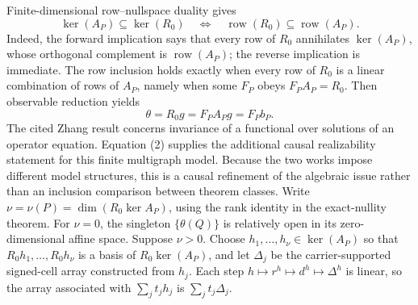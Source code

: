 Finite-dimensional row--nullspace duality gives
\[
\ker(A_P)\subseteq\ker(R_0)
\quad\Longleftrightarrow\quad
\operatorname{row}(R_0)\subseteq\operatorname{row}(A_P).
\tag{3}
\]
Indeed, the forward implication says that every row of \(R_0\) annihilates \(\ker(A_P)\), whose orthogonal complement is \(\operatorname{row}(A_P)\); the reverse implication is immediate.  The row inclusion holds exactly when every row of \(R_0\) is a linear combination of rows of \(A_P\), namely when some \(F_P\) obeys \(F_PA_P=R_0\).  Then observable reduction yields
\[
\theta=R_0g=F_PA_Pg=F_Pb_P.
\tag{4}
\]
The cited Zhang result concerns invariance of a functional over solutions of an operator equation.  Equation (2) supplies the additional causal realizability statement for this finite multigraph model.  Because the two works impose different model structures, this is a causal refinement of the algebraic issue rather than an inclusion comparison between theorem classes.
Write \(\nu=\nu(P)=\dim(R_0\ker A_P)\), using the rank identity in the exact-nullity theorem.  For \(\nu=0\), the singleton \(\{\theta(Q)\}\) is relatively open in its zero-dimensional affine space.  Suppose \(\nu>0\).  Choose \(h_1,\ldots,h_\nu\in\ker(A_P)\) so that \(R_0h_1,\ldots,R_0h_\nu\) is a basis of \(R_0\ker(A_P)\), and let \(\Delta_j\) be the carrier-supported signed-cell array constructed from \(h_j\).  Each step \(h\mapsto r^h\mapsto d^h\mapsto\Delta^h\) is linear, so the array associated with \(\sum_jt_jh_j\) is \(\sum_jt_j\Delta_j\).

